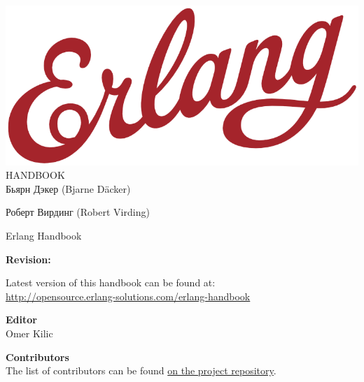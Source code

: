 \documentclass[oneside]{book}
\begin{document}
\begin{titlepage}
\centering

\vspace*{70pt}
\includegraphics[scale=0.3]{includes/erlang-logo.png}\\[0.8\baselineskip]
{\Huge \sffamily HANDBOOK}\\
\vspace{250pt}
{\LARGE \sffamily Бьярн Дэкер (Bjarne D\"acker)}\par
{\LARGE \sffamily Роберт Вирдинг (Robert Virding)}\par

\end{titlepage}


\clearpage
\thispagestyle{empty}
{\Huge Erlang Handbook}\\[0.1\baselineskip]

\vspace{20pt}
{\Large \textbf{Revision:}\\[0.2\baselineskip]
\immediate{}

\immediate{}
}

\vspace{20pt}
{\large Latest version of this handbook can be found at:\\
\url{http://opensource.erlang-solutions.com/erlang-handbook}}

\vfill

\textbf{Editor}\\[0.1\baselineskip]
Omer Kilic

\textbf{Contributors}\\[0.1\baselineskip]
The list of contributors can be found \href{https://github.com/esl/erlang-handbook/graphs/contributors}{on the project repository}.
\end{document}
